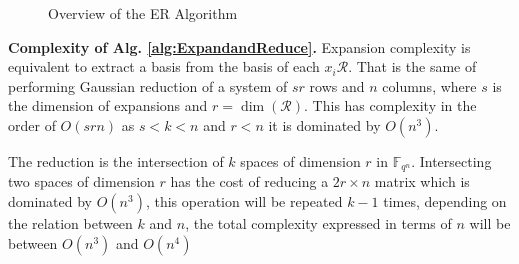\documentclass{article}
\newcommand{\Fqn}{\mathbb{F}_{q^n}}
\newcommand{\calR}{\mathcal{R}}
\begin{document}
\begin{figure}[h]
\begin{center}
    \end{center}
    \caption{Overview of the ER Algorithm}
    \label{fig: ER Algorithm Process Overview}
\end{figure}


\textbf{Complexity of Alg. \ref{alg:ExpandandReduce}.}
Expansion complexity is equivalent to extract a basis from the basis of each $x_i \calR$.
That is the same of performing Gaussian reduction of a system of $sr$ rows and $n$ columns, where $s$ is the dimension of expansions and $r= \dim(\calR).$
This has complexity in the order of $O(srn)$ as $s < k <n$ and $r < n$ it is dominated by $O(n^3)$.

The reduction is the intersection of $k$ spaces of dimension $r$ in $\Fqn$.
Intersecting two spaces of dimension $r$ has the cost of reducing a $2r \times n$ matrix which is dominated by $O(n^3)$, this operation will be repeated $k-1$ times, depending on the relation between $k$ and $n$, the total complexity expressed in terms of $n$ will be between $O(n^3)$ and $O(n^4)$
\end{document}
